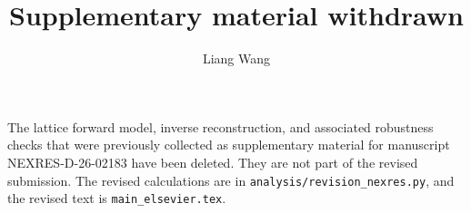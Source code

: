 \documentclass[preprint,12pt]{elsarticle}
\begin{document}
\begin{frontmatter}
\title{Supplementary material withdrawn}
\author{Liang Wang}
\end{frontmatter}

The lattice forward model, inverse reconstruction, and associated robustness checks that were previously collected as supplementary material for manuscript NEXRES-D-26-02183 have been deleted.
They are not part of the revised submission.
The revised calculations are in \texttt{analysis/revision\_nexres.py}, and the revised text is \texttt{main\_elsevier.tex}.
\end{document}
